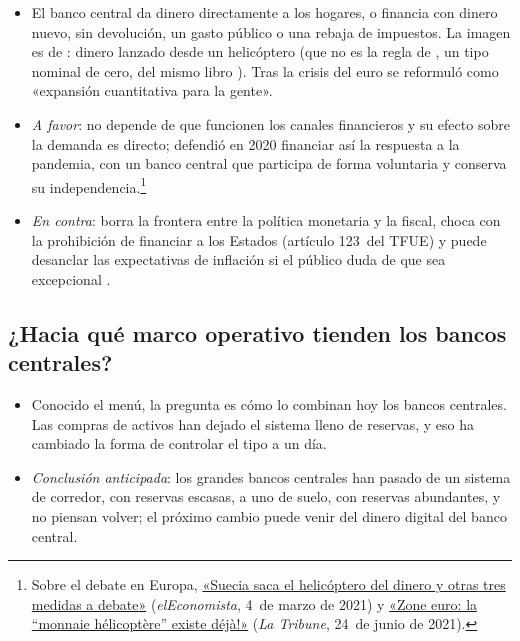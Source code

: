 \documentclass[11pt]{article}
\begin{document}
\begin{itemize}
\item El banco central da dinero directamente a los hogares, o financia con dinero nuevo, sin devolución, un gasto público o una rebaja de impuestos. La imagen es de \textcite{Friedman1969Optimum}: dinero lanzado desde un helicóptero (que no es la regla de , un tipo nominal de cero, del mismo libro ). Tras la crisis del euro se reformuló como «expansión cuantitativa para la gente»\nocite{Muellbauer2014QE}.
\item \emph{A favor}: no depende de que funcionen los canales financieros y su efecto sobre la demanda es directo; \textcite{Gali2020Helicopter} defendió en 2020 financiar así la respuesta a la pandemia, con un banco central que participa de forma voluntaria y conserva su independencia.\footnote{Sobre el debate en Europa, \href{https://www.eleconomista.es/mercados-cotizaciones/noticias/11084535/03/21/Suecia-saca-el-helicoptero-del-dinero-y-otras-tres-medidas-a-debate-Tenemos-que-abrirnos-a-la-innovacion.html}{«Suecia saca el helicóptero del dinero y otras tres medidas a debate»} (\emph{elEconomista}, 4~de marzo de 2021) y \href{https://www.latribune.fr/opinions/tribunes/zone-euro-la-monnaie-helicoptere-existe-deja-887481.html}{«Zone euro: la “monnaie hélicoptère” existe déjà!»} (\emph{La Tribune}, 24~de junio de 2021).}
\item \emph{En contra}: borra la frontera entre la política monetaria y la fiscal, choca con la prohibición de financiar a los Estados (artículo 123~del TFUE) y puede desanclar las expectativas de inflación si el público duda de que sea excepcional .
\end{itemize}

\subsection{¿Hacia qué marco operativo tienden los bancos centrales?}\label{sec:marco-operativo}

\begin{itemize}
\item Conocido el menú, la pregunta es cómo lo combinan hoy los bancos centrales. Las compras de activos han dejado el sistema lleno de reservas, y eso ha cambiado la forma de controlar el tipo a un día.
\item \emph{Conclusión anticipada}: los grandes bancos centrales han pasado de un sistema de corredor, con reservas escasas, a uno de suelo, con reservas abundantes, y no piensan volver; el próximo cambio puede venir del dinero digital del banco central.
\end{itemize}
\end{document}
